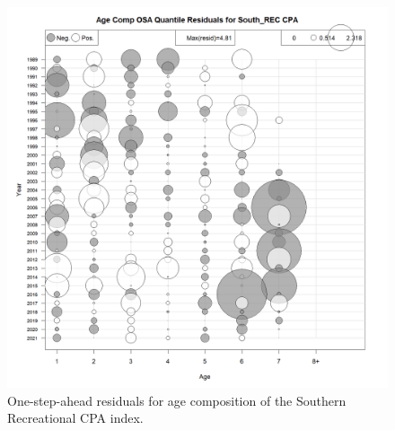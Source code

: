 \documentclass[
]{article}
\begin{document}
\begin{figure}

{\centering \includegraphics[width=1\linewidth]{../2023.RT.Runs/Run34/plots_png/diagnostics/Catch_age_comp_osa_resids_South_REC_CPA} 

}

\caption{One-step-ahead residuals for age composition of the Southern Recreational CPA index.}\label{fig:osa-South-reccpa-paa}
\end{figure}
\end{document}

